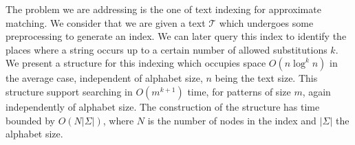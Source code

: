 The problem we are addressing is the one of text indexing for approximate matching. We consider that we are given a text $\mathcal{T}$ which undergoes some preprocessing to generate an index. We can later query this index to identify the places where a string occurs up to a certain number of allowed substitutions $k$. We present a structure for this indexing which occupies space $O(n\log^kn)$ in the average case, independent of alphabet size, $n$ being the text size. This structure support searching in $O(m^{k+1})$ time, for patterns of size $m$, again independently of alphabet size. The construction of the structure has time bounded by $O(N|\Sigma|)$, where $N$ is the number of nodes in the index and $|\Sigma|$ the alphabet size.
